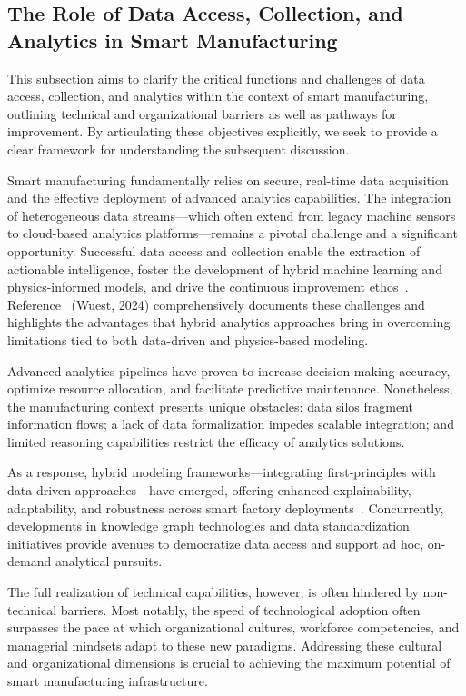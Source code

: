 \documentclass[sigconf]{acmart}
\begin{document}
\subsection{The Role of Data Access, Collection, and Analytics in Smart Manufacturing}

This subsection aims to clarify the critical functions and challenges of data access, collection, and analytics within the context of smart manufacturing, outlining technical and organizational barriers as well as pathways for improvement. By articulating these objectives explicitly, we seek to provide a clear framework for understanding the subsequent discussion.

Smart manufacturing fundamentally relies on secure, real-time data acquisition and the effective deployment of advanced analytics capabilities. The integration of heterogeneous data streams—which often extend from legacy machine sensors to cloud-based analytics platforms—remains a pivotal challenge and a significant opportunity. Successful data access and collection enable the extraction of actionable intelligence, foster the development of hybrid machine learning and physics-informed models, and drive the continuous improvement ethos~\cite{ref21}. Reference~\cite{ref21} (Wuest, 2024) comprehensively documents these challenges and highlights the advantages that hybrid analytics approaches bring in overcoming limitations tied to both data-driven and physics-based modeling.

Advanced analytics pipelines have proven to increase decision-making accuracy, optimize resource allocation, and facilitate predictive maintenance. Nonetheless, the manufacturing context presents unique obstacles: data silos fragment information flows; a lack of data formalization impedes scalable integration; and limited reasoning capabilities restrict the efficacy of analytics solutions.

As a response, hybrid modeling frameworks—integrating first-principles with data-driven approaches—have emerged, offering enhanced explainability, adaptability, and robustness across smart factory deployments~\cite{ref21}. Concurrently, developments in knowledge graph technologies and data standardization initiatives provide avenues to democratize data access and support ad hoc, on-demand analytical pursuits.

The full realization of technical capabilities, however, is often hindered by non-technical barriers. Most notably, the speed of technological adoption often surpasses the pace at which organizational cultures, workforce competencies, and managerial mindsets adapt to these new paradigms. Addressing these cultural and organizational dimensions is crucial to achieving the maximum potential of smart manufacturing infrastructure.
\end{document}
